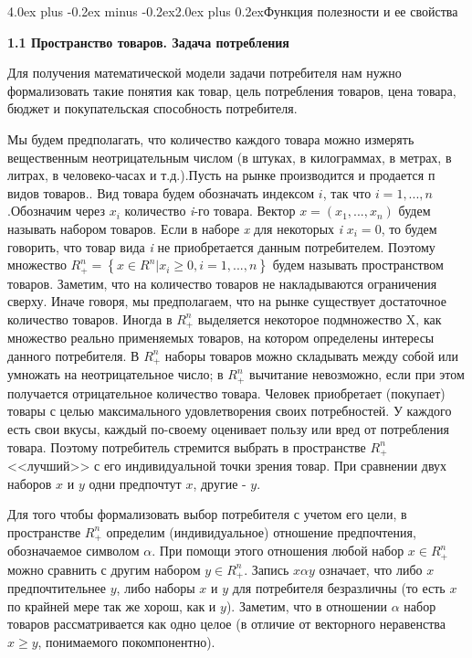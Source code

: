 \documentclass[12pt, 4paper]{book}
\makeatletter
\renewcommand{\section}{\@startsection{section}{1}{1pt}%
	{4.0ex plus -0.2ex minus -0.2ex}{2.0ex plus 0.2ex}{\centering\bf}}%
\makeatother
\begin{document}
{\section{Функция полезности и ее свойства} \label{par2.1}
\begin{center}
\textbf{1.1 Пространство товаров. Задача потребления}
\end{center}
\par
Для получения математической модели задачи потребителя нам нужно формализовать такие понятия как товар, цель потребления товаров, цена товара, бюджет и покупательская способность потребителя.
\par
Мы будем предполагать, что количество каждого товара можно измерять вещественным неотрицательным числом (в штуках, в килограммах, в метрах, в литрах, в человеко-часах и т.д.).Пусть на рынке производится и продается п видов товаров.. Вид товара будем обозначать индексом $i$, так что $i=1,...,n$.Обозначим через $x_{i}$ количество \textit{i}-го товара. Вектор 
$x = \left(x_{1} ,..., x_{n} \right)$ будем называть набором товаров. Если в наборе \textit{x} для некоторых \textit{i} $x_{i}=0$, то будем говорить, что товар вида \textit{i} не приобретается данным потребителем. Поэтому множество $R_{+}^{n}= \left\{x\in R^{n} | x_{i}\geq0,i=1,...,n\right\}$ будем называть пространством товаров. Заметим, что на количество товаров не накладываются ограничения сверху. Иначе говоря, мы предполагаем, что на рынке существует достаточное количество товаров. Иногда
в $R_{+}^{n}$ выделяется некоторое подмножество X, как множество реально применяемых товаров, на котором определены интересы данного потребителя. В $R_{+}^{n}$ наборы товаров можно складывать между собой или умножать на неотрицательное число; в $R_{+}^{n}$ вычитание невозможно, если при этом получается отрицательное количество товара. Человек приобретает (покупает) товары с целью максимального удовлетворения своих потребностей. У каждого есть свои вкусы, каждый по-своему оценивает пользу или вред от потребления товара. Поэтому потребитель стремится выбрать в пространстве $R_{+}^{n}$ <<лучший>> с его индивидуальной точки зрения товар. При сравнении двух наборов $x$ и $y$ одни предпочтут $x$, другие - $y$.
\par
Для того чтобы формализовать выбор потребителя с учетом его цели, в пространстве $R_{+}^{n}$ определим (индивидуальное) отношение предпочтения, обозначаемое символом $\alpha $. При помощи этого отношения любой набор $x\in R_{+}^{n}$ можно сравнить с другим набором $y\in R_{+}^{n}$. Запись $x \alpha y$ означает, что либо $x$ предпочтительнее $y$, либо наборы $x$ и $y$ для потребителя безразличны (то есть $x$ по крайней мере так же хорош, как и $y$). Заметим, что в отношении $\alpha$ набор товаров рассматривается как одно целое (в отличие от векторного неравенства $x \geq y$, понимаемого покомпонентно).
}
\end{document}
